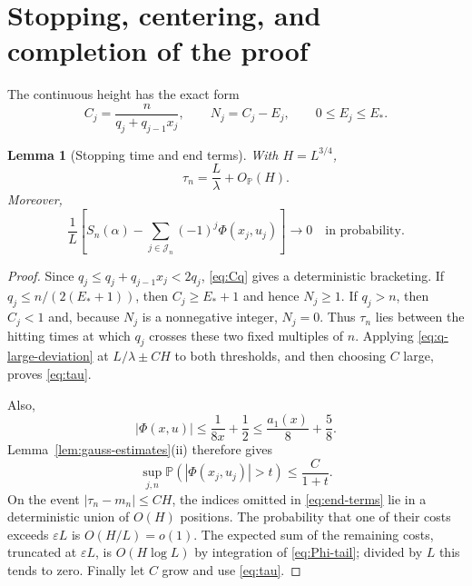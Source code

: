 \documentclass[11pt,a4paper]{amsart}
\newtheorem{lemma}[theorem]{Lemma}
\theoremstyle{definition}
\theoremstyle{remark}
\newcommand{\Pp}{\mathbb P}
\begin{document}
\section{Stopping, centering, and completion of the proof}

The continuous height has the exact form
\begin{equation}\label{eq:Cq}
 C_j=\frac{n}{q_j+q_{j-1}x_j},
 \qquad N_j=C_j-E_j,\qquad 0\le E_j\le E_*.
\end{equation}

\begin{lemma}[Stopping time and end terms]\label{lem:stopping}
With $H=L^{3/4}$,
\begin{equation}\label{eq:tau}
 \tau_n=\frac L\lambda+O_{\Pp}(H).
\end{equation}
Moreover,
\begin{equation}\label{eq:end-terms}
 \frac1L\left[
 S_n(\alpha)-\sum_{j\in\mathcal J_n}(-1)^j\Phi(x_j,u_j)
 \right]\longrightarrow0
 \quad\text{in probability}.
\end{equation}
\end{lemma}

\begin{proof}
Since $q_j\le q_j+q_{j-1}x_j<2q_j$, \eqref{eq:Cq} gives a deterministic
bracketing.  If $q_j\le n/(2(E_*+1))$, then $C_j\ge E_*+1$ and hence
$N_j\ge1$.  If $q_j>n$, then $C_j<1$ and, because $N_j$ is a nonnegative
integer, $N_j=0$.  Thus $\tau_n$ lies between the hitting times at which
$q_j$ crosses these two fixed multiples of $n$.  Applying
\eqref{eq:q-large-deviation} at $L/\lambda\pm CH$ to both thresholds, and
then choosing $C$ large, proves \eqref{eq:tau}.

Also,
\begin{equation}\label{eq:Phi-tail-bound}
 |\Phi(x,u)|\le\frac1{8x}+\frac12
 \le\frac{a_1(x)}8+\frac58.
\end{equation}
Lemma~\ref{lem:gauss-estimates}(ii) therefore gives
\begin{equation}\label{eq:Phi-tail}
 \sup_{j,n}\Pp(|\Phi(x_j,u_j)|>t)\le\frac{C}{1+t}.
\end{equation}
On the event $|\tau_n-m_n|\le CH$, the indices omitted in
\eqref{eq:end-terms} lie in a deterministic union of $O(H)$ positions.
The probability that one of their costs exceeds $\varepsilon L$ is
$O(H/L)=o(1)$.  The expected sum of the remaining costs, truncated at
$\varepsilon L$, is $O(H\log L)$ by integration of
\eqref{eq:Phi-tail}; divided by $L$ this tends to zero.  Finally let $C$ grow
and use \eqref{eq:tau}.
\end{proof}
\end{document}
